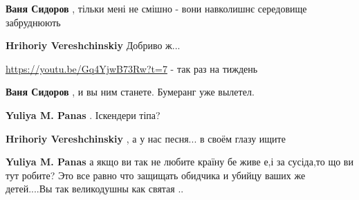 \begin{itemize}
\begin{itemize}
\begin{itemize}
\textbf{Ваня Сидоров} , тільки мені не смішно - вони навколишнє середовище забруднюють

 
\textbf{Hrihoriy Vereshchinskiy} Добриво ж...

 
\url{https://youtu.be/Gq4YjwB73Rw?t=7} - так раз на тиждень


 
\textbf{Ваня Сидоров} , и вы ним станете. Бумеранг уже вылетел.

 
\textbf{Yuliya M. Panas} . Іскендери тіпа?

\end{itemize}


 
\textbf{Hrihoriy Vereshchinskiy} , а у нас песня... в своём глазу ищите

\begin{itemize}
 
\textbf{Yuliya M. Panas} а якщо ви так не любите країну бе живе е,і за сусіда,то що ви тут робите?
Это все равно что защищать обидчика и убийцу ваших же детей....Вы так великодушны как святая ..
\end{itemize}


\end{itemize}
\end{itemize}
